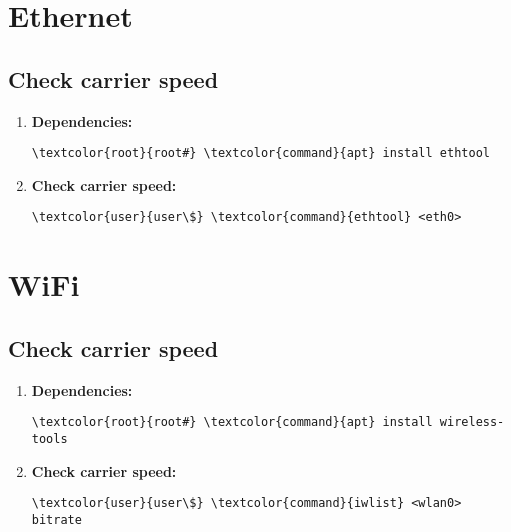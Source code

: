\documentclass[10pt, a4paper, onecolumn, openany]{book} %
\begin{document}
\section{Ethernet}
\subsection{Check carrier speed}
\begin{enumerate}
    \item \textbf{Dependencies:}
\begin{Verbatim}[commandchars=\\\{\}]
\textcolor{root}{root#} \textcolor{command}{apt} install ethtool
\end{Verbatim}
    \item \textbf{Check carrier speed:}
\begin{Verbatim}[commandchars=\\\{\}]
\textcolor{user}{user\$} \textcolor{command}{ethtool} <eth0>
\end{Verbatim}
\end{enumerate}
\section{WiFi}
\subsection{Check carrier speed}
\begin{enumerate}
    \item \textbf{Dependencies:}
\begin{Verbatim}[commandchars=\\\{\}]
\textcolor{root}{root#} \textcolor{command}{apt} install wireless-tools
\end{Verbatim}
    \item \textbf{Check carrier speed:}
\begin{Verbatim}[commandchars=\\\{\}]
\textcolor{user}{user\$} \textcolor{command}{iwlist} <wlan0> bitrate
\end{Verbatim}
\end{enumerate}
\end{document}
